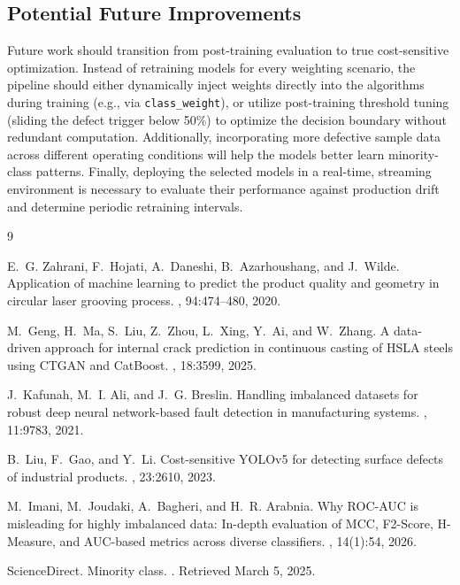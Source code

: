 \documentclass{article}
\begin{document}
\subsection{Potential Future Improvements} 
Future work should transition from post-training evaluation to true cost-sensitive optimization. Instead of retraining models for every weighting scenario, the pipeline should either dynamically inject weights directly into the algorithms during training (e.g., via \texttt{class\_weight}), or utilize post-training threshold tuning (sliding the defect trigger below 50\%) to optimize the decision boundary without redundant computation. Additionally, incorporating more defective sample data across different operating conditions will help the models better learn minority-class patterns. Finally, deploying the selected models in a real-time, streaming environment is necessary to evaluate their performance against production drift and determine periodic retraining intervals.


\newpage


\begin{thebibliography}{9}

E.~G. Zahrani, F.~Hojati, A.~Daneshi, B.~Azarhoushang, and J.~Wilde.
\newblock Application of machine learning to predict the product quality and geometry in circular laser grooving process.
, 94:474--480, 2020.

M.~Geng, H.~Ma, S.~Liu, Z.~Zhou, L.~Xing, Y.~Ai, and W.~Zhang.
\newblock A data-driven approach for internal crack prediction in continuous casting of HSLA steels using CTGAN and CatBoost.
, 18:3599, 2025.

J.~Kafunah, M.~I. Ali, and J.~G. Breslin.
\newblock Handling imbalanced datasets for robust deep neural network-based fault detection in manufacturing systems.
, 11:9783, 2021.

B.~Liu, F.~Gao, and Y.~Li.
\newblock Cost-sensitive YOLOv5 for detecting surface defects of industrial products.
, 23:2610, 2023.

M.~Imani, M.~Joudaki, A.~Bagheri, and H.~R. Arabnia.
\newblock Why {ROC-AUC} is misleading for highly imbalanced data: In-depth
  evaluation of {MCC}, {F2-Score}, {H-Measure}, and {AUC}-based metrics across
  diverse classifiers.
, 14(1):54, 2026.

ScienceDirect.
\newblock Minority class.
.
\newblock Retrieved March 5, 2025.

\end{thebibliography}
\end{document}
